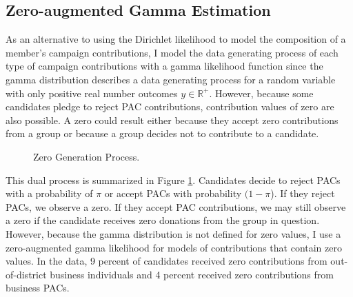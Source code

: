 \documentclass[12pt]{article}
\begin{document}
\singlespacing
{}
%
\printbibliography
\pagebreak


\begin{appendices}
\doublespacing
\setcounter{table}{0}
\renewcommand{\thetable}{A\arabic{table}}

\section{Zero-augmented Gamma Estimation} \label{sec: zip model}

As an alternative to using the Dirichlet likelihood to model the composition of a member's campaign contributions, I model the data generating process of each type of campaign contributions with a gamma likelihood function since the gamma distribution describes a data generating process for a random variable with only positive real number outcomes $y \in  \mathbb{R}^+$. However, because some candidates pledge to reject PAC contributions, contribution values of zero are also possible. A zero could result either because they accept zero contributions from a group or because a group decides not to contribute to a candidate. 

\begin{figure}[!htb]
    \centering
    \footnotesize
    \caption{Zero Generation Process.}
    \label{fig: zero process}
\end{figure}

This dual process is summarized in Figure \ref{fig: zero process}. Candidates decide to reject PACs with a probability of $\pi$ or accept PACs with probability $(1 - \pi$). If they reject PACs, we observe a zero. If they accept PAC contributions, we may still observe a zero if the candidate receives zero donations from the group in question. However, because the gamma distribution is not defined for zero values, I use a zero-augmented gamma likelihood for models of contributions that contain zero values. In the data, 9 percent of candidates received zero contributions from out-of-district business individuals and 4 percent received zero contributions from business PACs.


\end{appendices}
\end{document}
